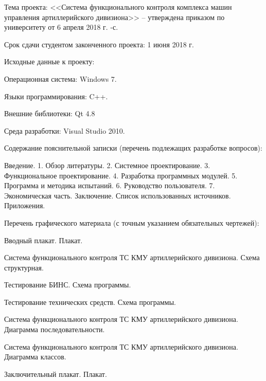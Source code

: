 {    %
	    \begin{legal}[leftmargin=*,label={\arabic*}]
	    \item Тема проекта: <<Система функционального контроля комплекса машин управления артиллерийского дивизиона>> --
		    утверждена приказом по университету от 6 апреля 2018 г. -с.

		    \vspace{1em}

	    \item Срок сдачи студентом законченного проекта: 1 июня 2018 г.

		    \vspace{1em}

	    \item Исходные данные к проекту:

		    \begin{legal}[label*={.\arabic*}]
		    \item Операционная система: Windows 7.
		    \item Языки программирования: C++.
		    \item Внешние библиотеки: Qt 4.8
		    \item Среда разработки: Visual Studio 2010.
		    \end{legal}

		    \vspace{1em}

	    \item Содержание пояснительной записки (перечень подлежащих разработке вопросов):

		    Введение.
		    1. Обзор литературы.
		    2. Системное проектирование.
		    3. Функциональное проектирование.
		    4. Разработка программных модулей.
		    5. Программа и методика испытаний.
		    6. Руководство пользователя.
		    7. Экономическая часть.
		    Заключение.
		    Список использованных источников.
		    Приложения.

		    \vspace{1em}

	    \item Перечень графического материала (с точным указанием обязательных чертежей):
		    \begin{legal}[label*={.\arabic*}]
		    \item Вводный плакат. Плакат.
			    \clearpage
			    \thispagestyle{empty}
		    \item Система функционального контроля ТС КМУ артиллерийского дивизиона. Схема структурная.
		    \item Тестирование БИНС. Схема программы.
		    \item Тестирование технических средств. Схема программы.
		    \item Система функционального контроля ТС КМУ артиллерийского дивизиона. Диаграмма последовательности.
		    \item Система функционального контроля ТС КМУ артиллерийского дивизиона. Диаграмма классов.
		    \item Заключительный плакат. Плакат.
		    \end{legal}


\end{legal}}
